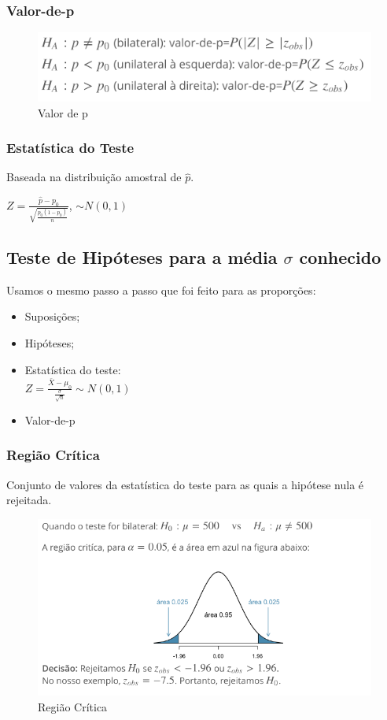 \documentclass[a4paper, 12pt]{article}
\begin{document}
\subsubsection{Valor-de-p}
	\begin{figure}[h]
		\centering
		\includegraphics[width=0.7\linewidth]{imagens/p}
		\caption{Valor de p}
		\label{fig:p}
	\end{figure}

\subsubsection{Estatística do Teste}
	Baseada na distribuição amostral de $\hat{p}$.
	\begin{center}
		\Large
		$
		Z = \frac{\hat{p}-p_0}{\sqrt{\frac{p_0(1-p_0)}{n}}}
		$,
		$\sim N(0,1)$
	\end{center}
	
\subsection{Teste de Hipóteses para a média $\sigma$ conhecido}
	Usamos o mesmo passo a passo que foi feito para as proporções:
		\begin{itemize}
			\item Suposições;
			\item Hipóteses;
			\item Estatística do teste:\\
				$
				Z = \frac{\bar{X}-\mu_0}{\frac{\sigma}{\sqrt{n}}}\sim N(0, 1)
				$
			\item Valor-de-p
		\end{itemize}
	
\subsubsection{Região Crítica}
	Conjunto de valores da estatística do teste para as quais a hipótese nula é rejeitada.
	\begin{figure}[h]
		\centering
		\includegraphics[width=0.8\linewidth]{imagens/g}
		\caption{Região Crítica}
		\label{fig:g}
	\end{figure}
	
\end{document}
